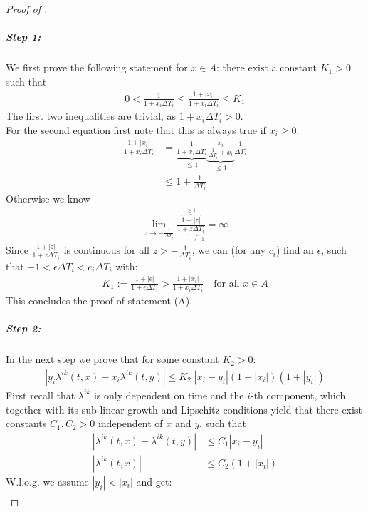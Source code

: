 \documentclass[12pt]{article}
\begin{document}
\begin{proof}[Proof of ]
		\subparagraph{Step 1:}
		We first prove the following statement for $ x \in A$: there exist a constant $K_1 > 0$ such that
		\begin{align*}
			0 < \frac{1}{1+ x_i\Delta T_i } \le \frac{1+|x_i|}{1+ x_i\Delta T_i } \le K_1 \tag{A}
		\end{align*}
		The first two inequalities are trivial, as $1 + x_i\Delta T_i > 0$.\\
		For the second equation first note that this is always true if $x_i \ge 0$:
		\begin{align*}
			\frac{1+|x_i|}{1+ x_i\Delta T_i } &= \underbrace{\frac{1}{1+ x_i\Delta T_i }}_{\le 1}  \underbrace{\frac{x_i}{\frac{1}{\Delta T_i}+ x_i }}_{\le 1}\frac{1}{\Delta T_i}\\
			&\le 1 + \frac{1}{\Delta T_i}
		\end{align*}
		Otherwise we know
		\begin{align*}
			\lim\limits_{z \rightarrow -\frac{1}{\Delta T_i}} \frac{\overbrace{1 + |z|}^{ \ge 1}}{1+ \underbrace{z\Delta T_i}_{\rightarrow -1}} = \infty
		\end{align*}
		Since $\frac{1+|z|}{1+ z\Delta T_i }$ is continuous for all $z > -\frac{1}{\Delta T_i}$, we can (for any $c_i$) find an $\epsilon$, such that $-1 < \epsilon\Delta T_i < c_i \Delta T_i$ with:
		\begin{align*}
			K_1:= \frac{1+|\epsilon|}{1+ \epsilon\Delta T_i } > \frac{1+|x_i|}{1+ x_i\Delta T_i } \quad \text{for all } x \in A
		\end{align*}
		This concludes the proof of statement (A).
		\subparagraph{Step 2:}
		In the next step we prove that for some constant $K_2 > 0$:
		\begin{align*}
			\left| y_i \lambda^{ik}(t, x) - x_i \lambda^{ik}(t,y) \right|\le K_2 \;\left| x_i - y_i \right| \left(1 + \left|x_i\right|\right)\left(1 + \left|y_i\right|\right) \tag{B}
		\end{align*}
		First recall that $\lambda^{i k}$ is only dependent on time and the $i$-th component, which together with its sub-linear growth and Lipschitz conditions yield that there exist constants $C_1,C_2 > 0$ independent of $x$ and $y$, such that
		\begin{align*}
			\left|\lambda^{i k}(t,x)- \lambda^{i k}(t,y) \right| &\le C_1\left|x_i - y_i\right|\\
			\left|\lambda^{i k}(t,x) \right| &\le C_2\left(1 + \left|x_i\right|\right)
		\end{align*}
		W.l.o.g. we assume $|y_i| < |x_i|$ and get:
		\begin{align*}

\end{align*}
\end{proof}
\end{document}
